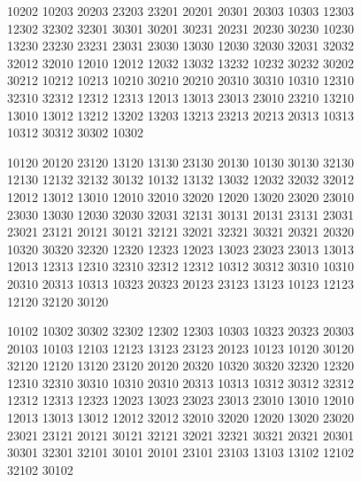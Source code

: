 \begingroup\footnotesize\ttfamily\begin{flushleft}
10202 10203 20203 23203 23201 20201 20301 20303 10303 12303\\
12302 32302 32301 30301 30201 30231 20231 20230 30230 10230\\
13230 23230 23231 23031 23030 13030 12030 32030 32031 32032\\
32012 32010 12010 12012 12032 13032 13232 10232 30232 30202\\
30212 10212 10213 10210 30210 20210 20310 30310 10310 12310\\
32310 32312 12312 12313 12013 13013 23013 23010 23210 13210\\
13010 13012 13212 13202 13203 13213 23213 20213 20313 10313\\
10312 30312 30302 10302\\
\end{flushleft}\endgroup
\begingroup\footnotesize\ttfamily\begin{flushleft}
10120 20120 23120 13120 13130 23130 20130 10130 30130 32130\\
12130 12132 32132 30132 10132 13132 13032 12032 32032 32012\\
12012 13012 13010 12010 32010 32020 12020 13020 23020 23010\\
23030 13030 12030 32030 32031 32131 30131 20131 23131 23031\\
23021 23121 20121 30121 32121 32021 32321 30321 20321 20320\\
10320 30320 32320 12320 12323 12023 13023 23023 23013 13013\\
12013 12313 12310 32310 32312 12312 10312 30312 30310 10310\\
20310 20313 10313 10323 20323 20123 23123 13123 10123 12123\\
12120 32120 30120\\
\end{flushleft}\endgroup
\begingroup\footnotesize\ttfamily\begin{flushleft}
10102 10302 30302 32302 12302 12303 10303 10323 20323 20303\\
20103 10103 12103 12123 13123 23123 20123 10123 10120 30120\\
32120 12120 13120 23120 20120 20320 10320 30320 32320 12320\\
12310 32310 30310 10310 20310 20313 10313 10312 30312 32312\\
12312 12313 12323 12023 13023 23023 23013 23010 13010 12010\\
12013 13013 13012 12012 32012 32010 32020 12020 13020 23020\\
23021 23121 20121 30121 32121 32021 32321 30321 20321 20301\\
30301 32301 32101 30101 20101 23101 23103 13103 13102 12102\\
32102 30102\\
\end{flushleft}\endgroup
